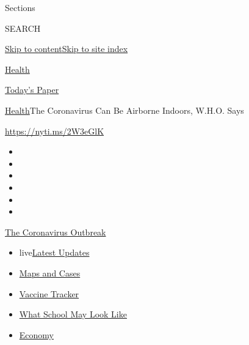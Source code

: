 Sections

SEARCH

\protect\hyperlink{site-content}{Skip to
content}\protect\hyperlink{site-index}{Skip to site index}

\href{https://www.nytimes.com/section/health}{Health}

\href{https://myaccount.nytimes.com/auth/login?response_type=cookie\&client_id=vi}{}

\href{https://www.nytimes.com/section/todayspaper}{Today's Paper}

\href{/section/health}{Health}\textbar{}The Coronavirus Can Be Airborne
Indoors, W.H.O. Says

\url{https://nyti.ms/2W3eGlK}

\begin{itemize}
\item
\item
\item
\item
\item
\item
\end{itemize}

\href{https://www.nytimes.com/news-event/coronavirus?action=click\&pgtype=Article\&state=default\&region=TOP_BANNER\&context=storylines_menu}{The
Coronavirus Outbreak}

\begin{itemize}
\tightlist
\item
  live\href{https://www.nytimes.com/2020/08/01/world/coronavirus-covid-19.html?action=click\&pgtype=Article\&state=default\&region=TOP_BANNER\&context=storylines_menu}{Latest
  Updates}
\item
  \href{https://www.nytimes.com/interactive/2020/us/coronavirus-us-cases.html?action=click\&pgtype=Article\&state=default\&region=TOP_BANNER\&context=storylines_menu}{Maps
  and Cases}
\item
  \href{https://www.nytimes.com/interactive/2020/science/coronavirus-vaccine-tracker.html?action=click\&pgtype=Article\&state=default\&region=TOP_BANNER\&context=storylines_menu}{Vaccine
  Tracker}
\item
  \href{https://www.nytimes.com/interactive/2020/07/29/us/schools-reopening-coronavirus.html?action=click\&pgtype=Article\&state=default\&region=TOP_BANNER\&context=storylines_menu}{What
  School May Look Like}
\item
  \href{https://www.nytimes.com/live/2020/07/31/business/stock-market-today-coronavirus?action=click\&pgtype=Article\&state=default\&region=TOP_BANNER\&context=storylines_menu}{Economy}
\end{itemize}

